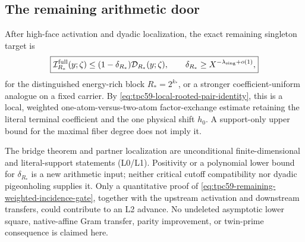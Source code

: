 \subsection{The remaining arithmetic door}

After high-face activation and dyadic localization, the exact remaining
singleton target is
\begin{equation}
 \boxed{
 \mathcal I_{R_*}^{\rm full}(y;\zeta)
 \le(1-\delta_{R_*})\mathcal D_{R_*}(y;\zeta),
 \qquad
 \delta_{R_*}\ge X^{-\lambda_{\rm sing}+o(1)},}
 \label{eq:tpc59-remaining-weighted-incidence-gate}
\end{equation}
for the distinguished energy-rich block \(R_*=2^{k_*}\), or a stronger
coefficient-uniform analogue on a fixed carrier.  By
\eqref{eq:tpc59-local-rooted-pair-identity}, this is a local, weighted
one-atom-versus-two-atom factor-exchange estimate retaining the literal
terminal coefficient and the one physical shift \(h_0\).  A support-only
upper bound for the maximal fiber degree does not imply it.

The bridge theorem and partner localization are unconditional
finite-dimensional and literal-support statements (L0/L1).  Positivity or
a polynomial lower bound for \(\delta_{R_*}\) is a new arithmetic input;
neither critical cutoff compatibility nor dyadic pigeonholing supplies it.
Only a quantitative proof of
\eqref{eq:tpc59-remaining-weighted-incidence-gate}, together with the
upstream activation and downstream transfers, could contribute to an L2
advance.  No undeleted asymptotic lower square, native-affine Gram transfer,
parity improvement, or twin-prime consequence is claimed here.
